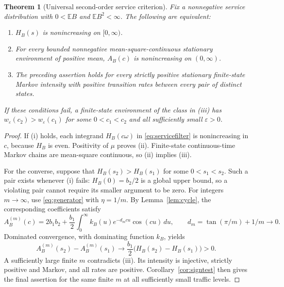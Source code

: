 \documentclass[10pt,a4paper]{amsart}
\numberwithin{equation}{section}
\newtheorem{theorem}{Theorem}[section]
\newcommand{\E}{\mathbb E}
\newcommand{\1}{\mathbf 1}
\newcommand{\eps}{\varepsilon}
\begin{document}
\begin{theorem}[Universal second-order service criterion]\label{thm:servicecriterion}
Fix a nonnegative service distribution with $0<\E B$ and $\E B^2<\infty$. The following are equivalent:
\begin{enumerate}
\item $H_B(s)$ is nonincreasing on $[0,\infty)$.
\item For every bounded nonnegative mean-square-continuous stationary environment of positive mean, $A_B(c)$ is nonincreasing on $(0,\infty)$.
\item The preceding assertion holds for every strictly positive stationary finite-state Markov intensity with positive transition rates between every pair of distinct states.
\end{enumerate}
If these conditions fail, a finite-state environment of the class in (iii) has $w_\eps(c_2)>w_\eps(c_1)$ for some $0<c_1<c_2$ and all sufficiently small $\eps>0$.
\end{theorem}
\begin{proof}
If (i) holds, each integrand $H_B(c\omega)$ in \eqref{eq:servicefilter} is nonincreasing in $c$, because $H_B$ is even. Positivity of $\mu$ proves (ii). Finite-state continuous-time Markov chains are mean-square continuous, so (ii) implies (iii).

For the converse, suppose that $H_B(s_2)>H_B(s_1)$ for some $0<s_1<s_2$. Such a pair exists whenever (i) fails: $H_B(0)=b_2/2$ is a global upper bound, so a violating pair cannot require its smaller argument to be zero. For integers $m\to\infty$, use \eqref{eq:generator} with $\eta=1/m$. By Lemma~\ref{lem:cycle}, the corresponding coefficients satisfy
\[
 A_B^{(m)}(c)=2b_1b_2+\frac{b_1}{2}
       \int_0^\infty k_B(u)e^{-d_mcu}\cos(cu)\,du,
 \qquad d_m=\tan(\pi/m)+1/m\longrightarrow0.
\]
Dominated convergence, with dominating function $k_B$, yields
\[
 A_B^{(m)}(s_2)-A_B^{(m)}(s_1)
 \longrightarrow\frac{b_1}{2}\bigl(H_B(s_2)-H_B(s_1)\bigr)>0.
\]
A sufficiently large finite $m$ contradicts (iii). Its intensity is injective, strictly positive and Markov, and all rates are positive. Corollary~\ref{cor:signtest} then gives the final assertion for the same finite $m$ at all sufficiently small traffic levels.
\end{proof}
\end{document}
